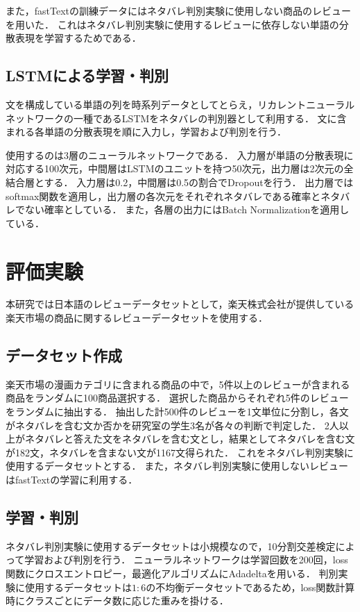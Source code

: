 \documentclass[autodetect-engine,dvipdfmx-if-dvi,ja=standard,a4j,jbase=10.5pt,twoside,twocolumn,magstyle=nomag*]{bxjsarticle}
\begin{document}
また，fastTextの訓練データにはネタバレ判別実験に使用しない商品のレビューを用いた．
これはネタバレ判別実験に使用するレビューに依存しない単語の分散表現を学習するためである．

\subsection{LSTMによる学習・判別}
文を構成している単語の列を時系列データとしてとらえ，リカレントニューラルネットワークの一種であるLSTMをネタバレの判別器として利用する．
文に含まれる各単語の分散表現を順に入力し，学習および判別を行う．

使用するのは3層のニューラルネットワークである．
入力層が単語の分散表現に対応する100次元，中間層はLSTMのユニットを持つ50次元，出力層は2次元の全結合層とする．
入力層は0.2，中間層は0.5の割合でDropoutを行う．
出力層ではsoftmax関数を適用し，出力層の各次元をそれぞれネタバレである確率とネタバレでない確率としている．
また，各層の出力にはBatch Normalizationを適用している．

\section{評価実験}
本研究では日本語のレビューデータセットとして，楽天株式会社が提供している楽天市場の商品に関するレビューデータセットを使用する．

\subsection{データセット作成}
楽天市場の漫画カテゴリに含まれる商品の中で，5件以上のレビューが含まれる商品をランダムに100商品選択する．
選択した商品からそれぞれ5件のレビューをランダムに抽出する．
抽出した計500件のレビューを1文単位に分割し，各文がネタバレを含む文か否かを研究室の学生3名が各々の判断で判定した．
2人以上がネタバレと答えた文をネタバレを含む文とし，結果としてネタバレを含む文が182文，ネタバレを含まない文が1167文得られた．
これをネタバレ判別実験に使用するデータセットとする．
また，ネタバレ判別実験に使用しないレビューはfastTextの学習に利用する．

\subsection{学習・判別}
ネタバレ判別実験に使用するデータセットは小規模なので，10分割交差検定によって学習および判別を行う．
ニューラルネットワークは学習回数を200回，loss関数にクロスエントロピー，最適化アルゴリズムにAdadeltaを用いる．
判別実験に使用するデータセットは$1:6$の不均衡データセットであるため，loss関数計算時にクラスごとにデータ数に応じた重みを掛ける．
\end{document}
